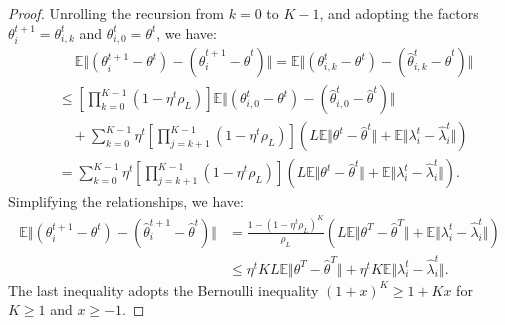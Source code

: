 \begin{proof}
    Unrolling the recursion from $k=0$ to $K-1$, and adopting the factors $\theta_i^{t+1} = \theta_{i,k}^t$ and $\theta_{i,0}^t = \theta^t$, we have:
    \begin{align*}
        &\quad \ \mathbb{E}\Vert\left(\theta_{i}^{t+1} - \theta^t \right) - \left(\hat{\theta}_{i}^{t+1} - \hat{\theta}^t \right)\Vert =  \mathbb{E}\Vert\left(\theta_{i,k}^t - \theta^t \right) - \left(\hat{\theta}_{i,k}^t - \hat{\theta}^t \right)\Vert\\
        &\leq \left[\prod_{k=0}^{K-1}\left(1-\eta^t\rho_L \right)\right]\mathbb{E}\Vert\left(\theta_{i,0}^t - \theta^t \right) - \left(\hat{\theta}_{i,0}^t - \hat{\theta}^t \right)\Vert\\
        &\quad + \sum_{k=0}^{K-1}\eta^t\left[\prod_{j=k+1}^{K-1}\left(1-\eta^t\rho_L \right)\right]\left(L\mathbb{E}\Vert \theta^t - \hat{\theta}^t\Vert + \mathbb{E}\Vert \lambda_i^t - \hat{\lambda}_i^t\Vert\right)\\
        &= \sum_{k=0}^{K-1}\eta^t\left[\prod_{j=k+1}^{K-1}\left(1-\eta^t\rho_L \right)\right]\left(L\mathbb{E}\Vert \theta^t - \hat{\theta}^t\Vert + \mathbb{E}\Vert \lambda_i^t - \hat{\lambda}_i^t\Vert\right).
    \end{align*}
    Simplifying the relationships, we have:
    \begin{align*}
        \mathbb{E}\Vert\left(\theta_{i}^{t+1} - \theta^t \right) - \left(\hat{\theta}_{i}^{t+1} - \hat{\theta}^t \right)\Vert
        &= \frac{1-\left(1-\eta^t\rho_L\right)^K}{\rho_L}\left(L\mathbb{E}\Vert \theta^T - \hat{\theta}^T\Vert + \mathbb{E}\Vert \lambda_i^t - \hat{\lambda}_i^t\Vert\right)\\
        &\leq \eta^t KL\mathbb{E}\Vert \theta^T - \hat{\theta}^T\Vert + \eta^t K\mathbb{E}\Vert \lambda_i^t - \hat{\lambda}_i^t\Vert.
    \end{align*}
    The last inequality adopts the Bernoulli inequality $\left(1+x\right)^K \geq 1 + Kx$ for $K\geq 1$ and $x\geq -1$.
\end{proof}
